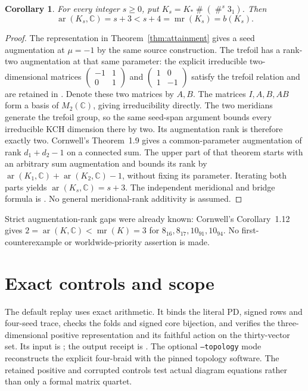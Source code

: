 \documentclass[11pt]{article}
\newtheorem{corollary}[theorem]{Corollary}
\newcommand{\mr}{\operatorname{mr}}
\newcommand{\ar}{\operatorname{ar}}
\newcommand{\C}{\mathbb C}
\begin{document}
\begin{corollary}\label{cor:sums}
For every integer $s\ge0$, put
$K_s=K_*\mathbin{\#}(\mathbin{\#}^{s}3_1)$. Then
\[
 \ar(K_s,\C)=s+3<s+4=\mr(K_s)=b(K_s).
\]
\end{corollary}
\begin{proof}
The representation in Theorem~\ref{thm:attainment} gives a seed
augmentation at $\mu=-1$ by the same source construction.
The trefoil has a rank-two augmentation at that same
parameter: the explicit irreducible two-dimensional matrices
$\left(\begin{smallmatrix}-1&1\\0&1\end{smallmatrix}\right)$ and
$\left(\begin{smallmatrix}1&0\\1&-1\end{smallmatrix}\right)$
satisfy the trefoil relation and are retained in
\cite[the connected-sum corollary and its control]{generic373}.
Denote these two matrices by $A,B$. The matrices $I,A,B,AB$
form a basis of $M_2(\C)$, giving irreducibility directly.
The two meridians generate the trefoil group, so the same
seed-span argument bounds every irreducible KCH dimension
there by two. Its augmentation rank is therefore exactly two.
Cornwell's Theorem~1.9 gives a common-parameter augmentation of
rank $d_1+d_2-1$ on a connected sum.
The upper part of that theorem starts with an arbitrary
sum augmentation and bounds its rank by
$\ar(K_1,\C)+\ar(K_2,\C)-1$, without fixing its parameter.
Iterating both parts yields $\ar(K_s,\C)=s+3$.
The independent meridional and bridge formula is
\cite[Corollary \texttt{cor:trefoils}]{new17}.
No general meridional-rank additivity is assumed.
\end{proof}

Strict augmentation-rank gaps were already known: Cornwell's
Corollary~1.12 gives $2=\ar(K,\C)<\mr(K)=3$ for
$8_{16},8_{17},10_{91},10_{94}$.
No first-counterexample or worldwide-priority assertion is made.

\section{Exact controls and scope}

The default  replay uses exact
arithmetic. It binds the literal PD, signed rows and four-seed trace,
checks the folds and signed core bijection, and verifies the
three-dimensional positive representation and its faithful
action on the thirty-vector set.
Its input is ; the output
receipt is .
The optional \texttt{--topology} mode reconstructs the explicit
four-braid with the pinned topology software.
The retained positive and corrupted controls test actual diagram
equations rather than only a formal matrix quartet.
\end{document}
